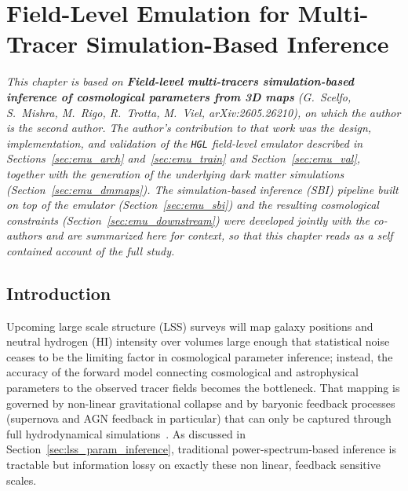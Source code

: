 
\newcommand{\HGL}{\texttt{HGL} }
\newcommand{\FastPM}{\texttt{FastPM} }

\chapter{Field-Level Emulation for Multi-Tracer Simulation-Based Inference}
\label{ch:emulator}

\noindent
\textit{This chapter is based on \textbf{Field-level multi-tracers
simulation-based inference of cosmological parameters from 3D maps}
(G.~Scelfo, S.~Mishra, M.~Rigo, R.~Trotta, M.~Viel, arXiv:2605.26210), on
which the author is the second author. The
author's contribution to that work was the design, implementation, and
validation of the \HGL field-level emulator described in
Sections~\ref{sec:emu_arch} and~\ref{sec:emu_train} and
Section~\ref{sec:emu_val}, together with the generation of the underlying
dark matter simulations (Section~\ref{sec:emu_dmmaps}). The simulation-based
inference (SBI) pipeline built on top of the emulator
(Section~\ref{sec:emu_sbi}) and the resulting cosmological constraints
(Section~\ref{sec:emu_downstream}) were developed jointly with the
co-authors and are summarized here for context, so that this chapter reads
as a self contained account of the full study.}

\section{Introduction}
\label{sec:emu_intro}

Upcoming large scale structure (LSS) surveys will map galaxy positions and
neutral hydrogen (HI) intensity over volumes large enough that statistical
noise ceases to be the limiting factor in cosmological parameter inference;
instead, the accuracy of the forward model connecting cosmological and
astrophysical parameters to the observed tracer fields becomes the
bottleneck. That mapping is governed by non-linear gravitational collapse
and by baryonic feedback processes (supernova and AGN feedback in
particular) that can only be captured through full hydrodynamical
simulations~\citep{villaescusa-navarro_camels_2022}. As discussed in Section~\ref{sec:lss_param_inference}, traditional power-spectrum-based inference is tractable but information lossy on exactly these non linear, feedback sensitive scales.


